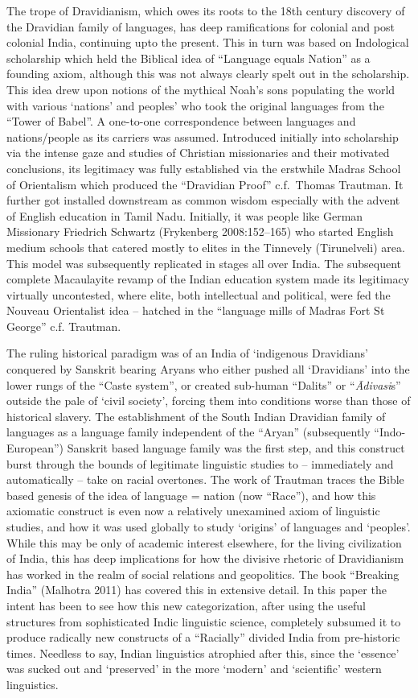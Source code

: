 The trope of Dravidianism, which owes its roots to the 18th century discovery of the Dravidian family of languages, has deep ramifications for colonial and post colonial India, continuing upto the present. This in turn was based on Indological scholarship which held the Biblical idea of “Language equals Nation” as a founding axiom, although this was not always clearly spelt out in the scholarship. This idea drew upon notions of the mythical Noah’s sons populating the world with various ‘nations’ and peoples’ who took the original languages from the “Tower of Babel”. A one-to-one correspondence between languages and nations/people as its carriers was assumed. Introduced initially into scholarship via the intense gaze and studies of Christian missionaries and their motivated conclusions, its legitimacy was fully established via the erstwhile Madras School of Orientalism which produced the “Dravidian Proof” c.f.\ Thomas Trautman. It further got installed downstream as common wisdom especially with the advent of English education in Tamil Nadu. Initially, it was people like German Missionary Friedrich Schwartz (Frykenberg 2008:152–165) who started English medium schools that catered mostly to elites in the Tinnevely (Tirunelveli) area. This model was subsequently replicated in stages all over India. The subsequent complete Macaulayite revamp of the Indian education system made its legitimacy virtually uncontested, where elite, both intellectual and political, were fed the Nouveau Orientalist idea – hatched in the “language mills of Madras Fort St George” c.f. Trautman.

The ruling historical paradigm was of an India of ‘indigenous Dravidians’ conquered by Sanskrit bearing Aryans who either pushed all ‘Dravidians’ into the lower rungs of the “Caste system”, or created sub-human “Dalits” or “\textit{Ādivasi}s” outside the pale of ‘civil society’, forcing them into conditions worse than those of historical slavery. The establishment of the South Indian Dravidian family of languages as a language family independent of the “Aryan” (subsequently “Indo-European”) Sanskrit based language family was the first step, and this construct burst through the bounds of legitimate linguistic studies to – immediately and automatically – take on racial overtones. The work of Trautman traces the Bible based genesis of the idea of language = nation (now “Race”), and how this axiomatic construct is even now a relatively unexamined axiom of linguistic studies, and how it was used globally to study ‘origins’ of languages and ‘peoples’. While this may be only of academic interest elsewhere, for the living civilization of India, this has deep implications for how the divisive rhetoric of Dravidianism has worked in the realm of social relations and geopolitics. The book “Breaking India” (Malhotra 2011) has covered this in extensive detail. In this paper the intent has been to see how this new categorization, after using the useful structures from sophisticated Indic linguistic science, completely subsumed it to produce radically new constructs of a “Racially” divided India from pre-historic times. Needless to say, Indian linguistics atrophied after this, since the ‘essence’ was sucked out and ‘preserved’ in the more ‘modern’ and ‘scientific’ western linguistics.

